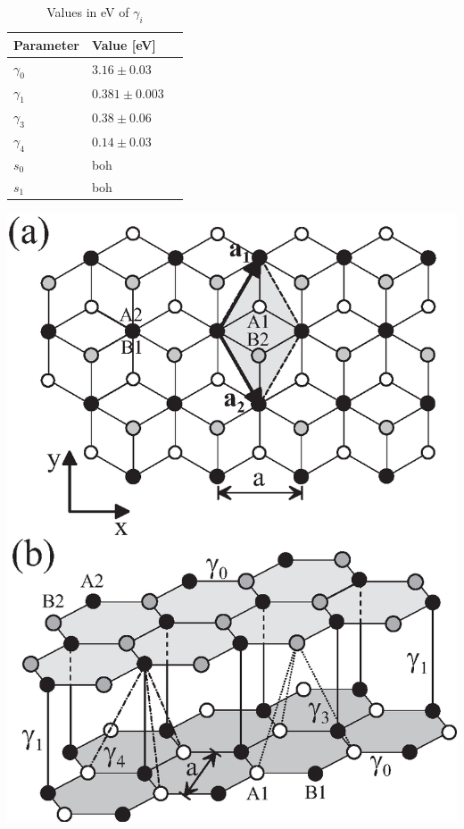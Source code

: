 \begin{table}[ht]
    \begin{minipage}[b]{0.56\linewidth}
    \centering
    \begin{tabular}{ l l r }
        \hline
        Parameter & Value [eV] \\ 
        \hline \hline
        $\gamma_0$ & $3.16\pm0.03$ \\
        $\gamma_1$ & $0.381\pm 0.003$ \\
        $\gamma_3$ & $0.38\pm 0.06$ \\
        $\gamma_4$ & $0.14\pm 0.03$ \\
        $s_0$ & boh\\
        $s_1$ & boh\\
        \hline
       \end{tabular}
        \caption{Values in eV of $\gamma_i$}
        \label{table:valuetable}
    \end{minipage}\hfill
    \begin{minipage}[b]{0.4\linewidth}
    \centering
    \includegraphics[width=\linewidth]{Immagini/graphene/bilayerlattice.eps}
    \label{fig:bilayer-lattice}
    \end{minipage}
\end{table}

